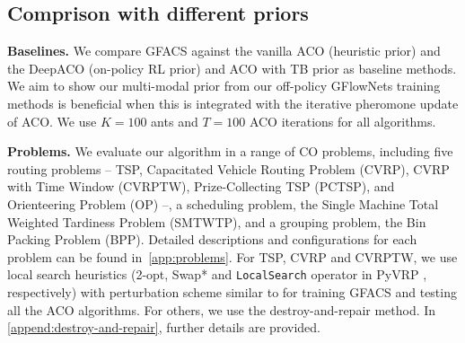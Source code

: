 \documentclass[twoside]{article}
\theoremstyle{plain}
\theoremstyle{definition}
\theoremstyle{remark}
\begin{document}
\begin{table}[t]
    \centering
    \caption{Experimental results on real-world datasets, TSPLib and CVRPLib. ‘$N$’ denotes the range of instance size and ‘\#’ denotes the number of instances in each set. We report the average optimality gap using the best-known costs.}
    \vspace{-0.5em}
    \resizebox{0.95\linewidth}{!}{}
    \label{tab:lib}
    \vspace{-0.5em}
\end{table}

\begin{table}[t]
    \centering
    \caption{Experimental results on TSP and CVRP. Results for methods with {*} are drawn from \citet{ye2023deepaco}, \citet{cheng2023select}, and \citet{jin2023pointerformer}. The reported objective value is averaged over 128 instances of TSP and 100 instances of CVRP. We report the average computation time per instance.
    }
    \vspace{-0.5em}
    \resizebox{1.0\textwidth}{!}
    {}
    \vspace{-0.5em}
    \label{tab:tsp_nls}
\end{table}

\subsection{Comprison with different priors}
\label{sec:exp-vs-other-aco}

\textbf{Baselines.} We compare GFACS against the vanilla ACO (heuristic prior) and the DeepACO \citep{ye2023deepaco} (on-policy RL prior) and ACO with TB prior as baseline methods. We aim to show our multi-modal prior from our off-policy GFlowNets training methods is beneficial when this is integrated with the iterative pheromone update of ACO. We use $K=100$ ants and $T=100$ ACO iterations for all algorithms.

\textbf{Problems.} We evaluate our algorithm in a range of CO problems, including five routing problems -- TSP, Capacitated Vehicle Routing Problem (CVRP), CVRP with Time Window (CVRPTW), Prize-Collecting TSP (PCTSP), and Orienteering Problem (OP) --, a scheduling problem, the Single Machine Total Weighted Tardiness Problem (SMTWTP), and a grouping problem, the Bin Packing Problem (BPP). Detailed descriptions and configurations for each problem can be found in~\cref{app:problems}. For TSP, CVRP and CVRPTW, we use local search heuristics (2-opt, Swap* and \texttt{LocalSearch} operator in PyVRP \citep{Wouda_Lan_Kool_PyVRP_2024}, respectively) with perturbation scheme similar to \citet{ye2023deepaco} for training GFACS and testing all the ACO algorithms. For others, we use the destroy-and-repair method. In \cref{append:destroy-and-repair}, further details are provided.
\end{document}
